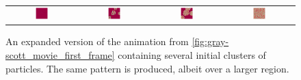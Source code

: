 \begin{figure}[h]
\centering
\mySfFamily
\begin{tabular}{c c c c}
\includegraphics[width = 0.19\textwidth]{../images/f038_100_multi_Moment_1} & \includegraphics[width = 0.19\textwidth]{../images/f038_100_multi_Moment_2} & \includegraphics[width = 0.19\textwidth]{../images/f038_100_multi_Moment_3} & \includegraphics[width = 0.19\textwidth]{../images/f038_100_multi_Moment_4}
\end{tabular}
\caption{An expanded version of the animation from \autoref{fig:gray-scott_movie_first_frame} containing several initial clusters of  particles. The same pattern is produced, albeit over a larger region.}
\label{fig:gray-scott_multiple_predators_first_frame}
\end{figure}

